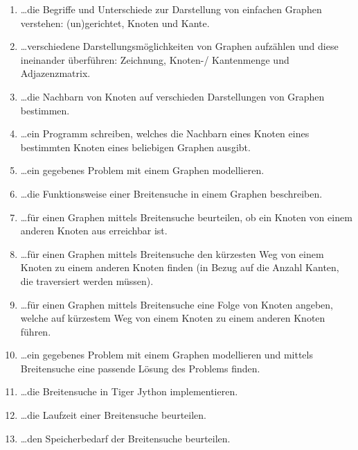 \begin{enumerate}
\item \dots die Begriffe und Unterschiede zur Darstellung von einfachen Graphen verstehen: (un)gerichtet, Knoten und Kante.

\item \dots verschiedene Darstellungsmöglichkeiten von Graphen aufzählen und diese ineinander überführen: Zeichnung, Knoten-/ Kantenmenge und Adjazenzmatrix.

\item \dots die Nachbarn von Knoten auf verschieden Darstellungen von Graphen bestimmen. 

\item \dots ein Programm schreiben, welches die Nachbarn eines Knoten eines bestimmten Knoten eines beliebigen Graphen ausgibt.

\item\dots ein gegebenes Problem mit einem Graphen modellieren.
 
\item \dots die Funktionsweise einer Breitensuche in einem Graphen beschreiben.

\item\dots f\"ur einen Graphen mittels Breitensuche beurteilen, ob ein Knoten von einem anderen Knoten aus erreichbar ist.

\item\dots f\"ur einen Graphen mittels Breitensuche den k\"urzesten Weg von einem Knoten zu einem anderen Knoten finden (in Bezug auf die Anzahl Kanten, die traversiert werden m\"ussen).

\item\dots f\"ur einen Graphen mittels Breitensuche eine Folge von Knoten angeben, welche auf k\"urzestem Weg von einem Knoten zu einem anderen Knoten f\"uhren.

\item \dots ein gegebenes Problem mit einem Graphen modellieren und mittels Breitensuche eine passende Lösung des Problems finden.

\item \dots die Breitensuche in Tiger Jython implementieren.

\item \dots die Laufzeit einer Breitensuche beurteilen.

\item \dots den Speicherbedarf der Breitensuche beurteilen.


\end{enumerate}

